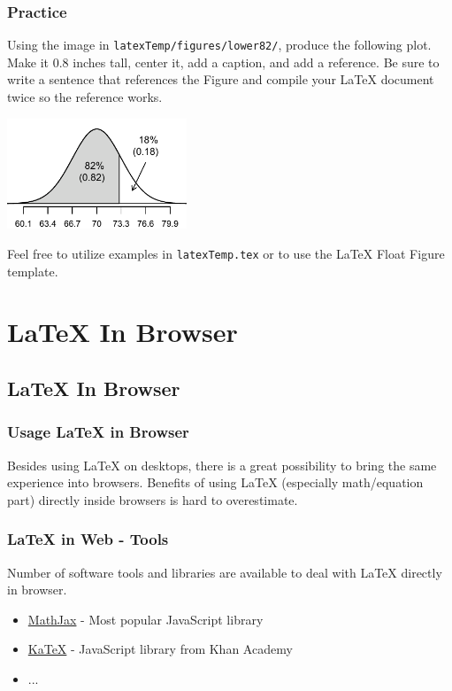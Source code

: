 \documentclass[slidestop,compress,mathserif]{beamer}
\begin{document}
\begin{frame}	\frametitle{Practice}
	
	Using the image in \texttt{\color{highlight}latexTemp/figures/lower82/}, produce the following plot. Make it 0.8 inches tall, center it, add a caption, and add a reference. Be sure to write a sentence that references the Figure and compile your LaTeX document twice so the reference works. \\
	
		\begin{center}
			\includegraphics[height=1.3in]{assignments/latexTemp/figures/lower82/lower82}
		\end{center}
		
	Feel free to utilize examples in \texttt{\color{highlight}latexTemp.tex} or to use the LaTeX Float Figure template.
		
\end{frame}

\section[LaTeX In Browser]{LaTeX In Browser}

\subsection{LaTeX In Browser}
	
	\begin{frame} \frametitle{Usage LaTeX in Browser}
		Besides using LaTeX on desktops, there is a great possibility to bring the same experience into browsers. Benefits of using LaTeX (especially math/equation part) directly inside browsers is hard to overestimate.
	\end{frame}
	
	\begin{frame} \frametitle{LaTeX in Web - Tools}
		Number of software tools and libraries are available to deal with LaTeX directly in browser.\\
		
		\begin{itemize}
			\item \href{https://www.mathjax.org/}{MathJax} - Most popular JavaScript library
			\item \href{https://khan.github.io/KaTeX/}{KaTeX} - JavaScript library from Khan Academy
			\item ...
		\end{itemize}
	
	\end{frame}
	
\end{document}
